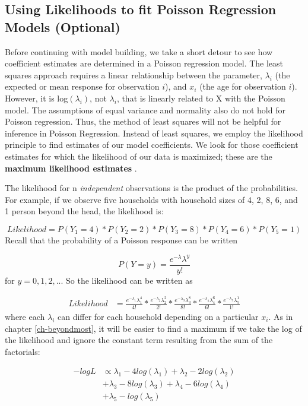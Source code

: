 \documentclass[
]{krantz}
\begin{document}
\hypertarget{likelihood.sec}{%
\subsection{Using Likelihoods to fit Poisson Regression Models (Optional)}\label{likelihood.sec}}

Before continuing with model building, we take a short detour to see how coefficient estimates are determined in a Poisson regression model. The least squares approach requires a linear relationship between the parameter, \(\lambda_i\) (the expected or mean response for observation \(i\)), and \(x_i\) (the age for observation \(i\)). However, it is log\((\lambda_i)\), not \(\lambda_i\), that is linearly related to X with the Poisson model. The assumptions of equal variance and normality also do not hold for Poisson regression. Thus, the method of least squares will not be helpful for inference in Poisson Regression. Instead of least squares, we employ the likelihood  principle to find estimates of our model coefficients. We look for those coefficient estimates for which the likelihood of our data is maximized; these are the \textbf{maximum likelihood estimates} .

The likelihood for n \emph{independent}  observations is the product of the probabilities. For example, if we observe five households with household sizes of 4, 2, 8, 6, and 1 person beyond the head, the likelihood is:

\[ Likelihood = P(Y_1=4)*P(Y_2=2)*P(Y_3=8)*P(Y_4=6)*P(Y_5=1)\]
Recall that the probability of a Poisson response can be written

\[P(Y=y)=\frac{e^{-\lambda}\lambda^y}{y!}\]
for \(y = 0, 1, 2, ...\) So the likelihood can be written as

\begin{align*}
 Likelihood&= \frac{ e^{-\lambda_1}\lambda_1^4 }{ 4! }*
 \frac{ e^{-\lambda_2}\lambda_2^2 }{ 2! } *\frac{e^{-\lambda_3}\lambda_3^8}{8!}*
 \frac{e^{-\lambda_4}\lambda_4^6}{6!}*\frac{e^{-\lambda_5}\lambda_5^1}{1!}
 \end{align*}
where each \(\lambda_i\) can differ for each household depending on a particular \(x_i\). As in chapter \ref{ch-beyondmost}, it will be easier to find a maximum if we take the log of the likelihood and ignore the constant term resulting from the sum of the factorials:

\begin{align}
 -logL& \propto \lambda_{1}-4log(\lambda_{1})+\lambda_{2}-2log(\lambda_{2}) \nonumber \\
 & +\lambda_{3}-8log(\lambda_{3})+\lambda_{4}-6log(\lambda_{4}) \nonumber \\
 & +\lambda_{5}-log(\lambda_{5})
 \label{eq:poisLoglik}
\end{align}
\end{document}
